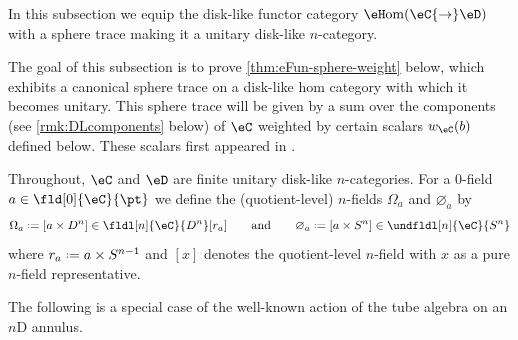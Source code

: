 \documentclass[12pt,reqno]{amsart}
\newcommand{\eHom}{{\eH}\mathrm{om}}
\newcommand{\C}{\eC}
\newcommand{\D}{\eD}
\DeclareRobustCommand{\coloneq}{\mathrel{\vcenter{\baselineskip0.5ex\lineskiplimit0pt\hbox{\scriptsize{\upshape.}}\hbox{\scriptsize{\upshape.}}}}=}
\begin{document}
In this subsection we equip the disk-like functor category $\eHom(\C{\to}\D)$ with a sphere trace making it a unitary disk-like $n$-category. 

The goal of this subsection is to prove \cref{thm:eFun-sphere-weight} below, which exhibits a canonical sphere trace on a disk-like hom category with which it becomes unitary. This sphere trace will be given by a sum over the components (see \cref{rmk:DLcomponents} below) of $\C$ weighted by certain scalars $w_\C(b)$ defined below. These scalars first appeared in \cite{W21}. 

Throughout, $\C$ and $\D$ are finite unitary disk-like $n$-categories. For a 0-field $a\in\fld[0]{\C}{\pt}$ we define the (quotient-level) $n$-fields $\Omega_a$ and $\varnothing_a$ by
\[
    \Omega_a
    \coloneq 
    [a\times D^n]
    \in
    \fldl[n]{\C}{D^n}[r_a]
    \qquad \text{and} \qquad
    \varnothing_a
    \coloneq
    [a\times S^n]\in\undfldl[n]{\C}{S^n}
\]
where $r_a \coloneq a\times S^{n-1}$ and $[x]$ denotes the quotient-level $n$-field with $x$ as a pure $n$-field representative.

The following is a special case of the well-known action of the tube algebra on an $n$D annulus.
\end{document}
